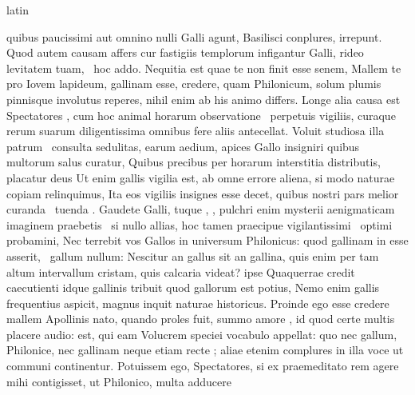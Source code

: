 \documentclass[12pt]{book}
\renewenvironment{latin}
    	{\begin{hyphenrules}{latin}}
    	{\end{hyphenrules}}
\begin{document}
\begin{pages}
\begin{latin}
\begin{Leftside}
                  quibus paucissimi aut omnino nulli Galli agunt, Basilisci conplures, irrepunt. Quod autem causam affers cur fastigiis templorum infigantur Galli, rideo levitatem tuam,  \ampersand\ hoc addo. Nequitia est quae te non finit esse senem, 
                  Mallem te pro Iovem lapideum, gallinam esse, credere, quam Philonicum,  solum plumis pinnisque involutus reperes, nihil enim ab his animo differs. 
                  Longe alia causa est Spectatores , cum hoc animal horarum observatione  \ampersand\ perpetuis vigiliis,
                  curaque rerum suarum diligentissima omnibus fere aliis antecellat. Voluit studiosa illa patrum  \ampersand\ consulta sedulitas, earum aedium, apices Gallo insigniri quibus multorum salus curatur, 
                  Quibus precibus per horarum interstitia distributis, placatur deus  
                  Ut enim gallis vigilia est, ab omne errore aliena, si modo naturae copiam relinquimus, Ita eos vigiliis insignes esse decet, quibus nostri pars melior curanda  \ampersand\ tuenda .
                  Gaudete Galli, tuque , , pulchri enim mysterii aenigmaticam imaginem praebetis
                   \ampersand\ si nullo allias, hoc tamen praecipue vigilantissimi  \ampersand\ optimi probamini, Nec terrebit vos Gallos in universum Philonicus: quod gallinam in  esse asserit, 
                   \ampersand\ gallum nullum: Nescitur an gallus sit an gallina, quis enim per tam altum intervallum cristam, quis calcaria videat?  
                  ipse Quaquerrae credit caecutienti idque gallinis tribuit quod gallorum est potius, Nemo enim gallis  frequentius aspicit,
                  magnus inquit naturae historicus. Proinde ego  esse credere mallem Apollinis nato, 
                  quando  proles fuit, summo amore , 
                  id quod certe multis placere audio:  est, qui eam Volucrem speciei vocabulo appellat: 
                  quo nec gallum, Philonice, nec gallinam neque etiam  recte ; 
                  aliae etenim complures in illa voce ut communi continentur. Potuissem ego, Spectatores, si ex praemeditato rem agere mihi contigisset, ut Philonico, multa adducere 

\end{Leftside}
\end{latin}
\end{pages}
\end{document}
